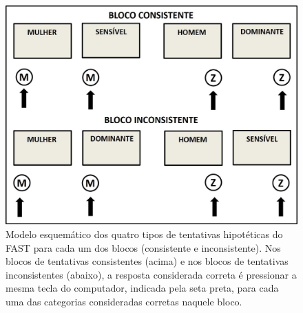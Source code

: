 \begin{figure}[t]
    \includegraphics[width=\linewidth]{5/figura3.jpg}
    \caption{Modelo esquemático dos quatro tipos de tentativas hipotéticas do FAST para cada um dos blocos (consistente e inconsistente). Nos blocos de tentativas consistentes (acima) e nos blocos de tentativas inconsistentes (abaixo), a resposta considerada correta é pressionar a mesma tecla do computador, indicada pela seta preta, para cada uma das categorias consideradas corretas naquele bloco.}
    \label{fig3}
\end{figure}

